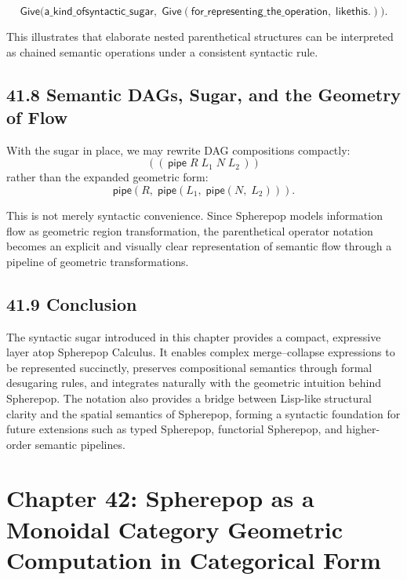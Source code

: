 \documentclass[12pt,letterpaper]{article}
\theoremstyle{remark}
\begin{document}
\[
\mathsf{Give}\Big(
     \mathsf{a\_kind\_of}\mathsf{syntactic\_sugar},\;
     \mathsf{Give}(
         \mathsf{for\_representing\_the\_operation},\;
         \mathsf{like}\mathsf{this.}
     )
\Big).
\]

This illustrates that elaborate nested parenthetical structures can be interpreted as chained semantic operations under a consistent syntactic rule.

\subsection{41.8 Semantic DAGs, Sugar, and the Geometry of Flow}

With the sugar in place, we may rewrite DAG compositions compactly:
\[
((\,\mathsf{pipe}\; R\; L_1\; N\; L_2\,))
\]
rather than the expanded geometric form:
\[
\mathsf{pipe}(R,\; \mathsf{pipe}(L_1,\; \mathsf{pipe}(N,\; L_2))).
\]

This is not merely syntactic convenience. Since Spherepop models information flow as geometric region transformation, the parenthetical operator notation becomes an explicit and visually clear representation of semantic flow through a pipeline of geometric transformations.

\subsection{41.9 Conclusion}

The syntactic sugar introduced in this chapter provides a compact, expressive layer atop Spherepop Calculus. It enables complex merge--collapse expressions to be represented succinctly, preserves compositional semantics through formal desugaring rules, and integrates naturally with the geometric intuition behind Spherepop. The notation also provides a bridge between Lisp-like structural clarity and the spatial semantics of Spherepop, forming a syntactic foundation for future extensions such as typed Spherepop, functorial Spherepop, and higher-order semantic pipelines.

\newpage

\section{Chapter 42: Spherepop as a Monoidal Category  
Geometric Computation in Categorical Form}
\end{document}
